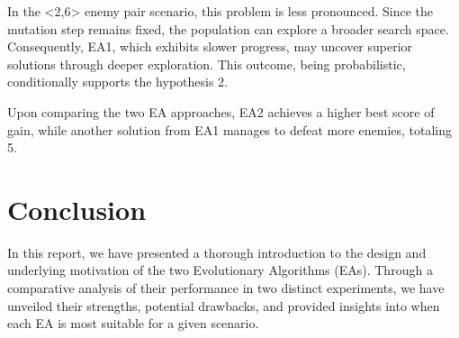 In the <2,6> enemy pair scenario, this problem is less pronounced. Since the mutation step remains fixed, the population can explore a broader search space. Consequently, EA1, which exhibits slower progress, may uncover superior solutions through deeper exploration. This outcome, being probabilistic, conditionally supports the hypothesis 2.

Upon comparing the two EA approaches, EA2 achieves a higher best score of gain, while another solution from EA1 manages to defeat more enemies, totaling 5. %

\section{Conclusion}
In this report, we have presented a thorough introduction to the design and underlying motivation of the two Evolutionary Algorithms (EAs). Through a comparative analysis of their performance in two distinct experiments, we have unveiled their strengths, potential drawbacks, and provided insights into when each EA is most suitable for a given scenario.

